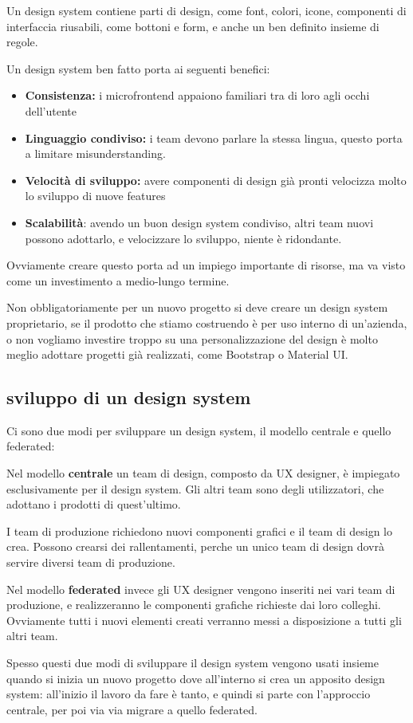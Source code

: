 Un design system contiene parti di design, come font, colori, icone, componenti di interfaccia riusabili, come bottoni 
e form, e anche un ben definito insieme di regole.

Un design system ben fatto porta ai seguenti benefici:
\begin{itemize}
    \item \textbf{Consistenza:} i microfrontend appaiono familiari tra di loro agli occhi dell’utente
    \item \textbf{Linguaggio condiviso:} i team devono parlare la stessa lingua, questo porta a limitare misunderstanding.
    \item \textbf{Velocità di sviluppo:} avere componenti di design già pronti velocizza molto lo sviluppo di nuove features
    \item \textbf{Scalabilità}: avendo un buon design system condiviso, altri team nuovi possono adottarlo, e velocizzare lo sviluppo, niente è ridondante.
\end{itemize}
Ovviamente creare questo porta ad un impiego importante di risorse, ma va visto come un investimento a medio-lungo termine.


Non obbligatoriamente per un nuovo progetto si deve creare un design system proprietario, se il prodotto che stiamo costruendo è 
per uso interno di un’azienda, o non vogliamo investire troppo su una personalizzazione del design è molto meglio adottare progetti
 già realizzati, come Bootstrap o Material UI.

\subsection{sviluppo di un design system}
Ci sono due modi per sviluppare un design system, il modello centrale e quello federated:

Nel modello \textbf{centrale} un team di design, composto da UX designer, è impiegato esclusivamente per il design system. Gli altri team sono degli utilizzatori, che adottano i
 prodotti di quest'ultimo.

I team di produzione richiedono nuovi componenti grafici e il team di design lo crea. 
Possono crearsi dei rallentamenti, perche un unico team di design dovrà servire diversi team di produzione.

Nel modello \textbf{federated} invece gli UX designer vengono inseriti nei vari team di produzione, e realizzeranno le componenti grafiche richieste dai loro colleghi. 
Ovviamente tutti i nuovi elementi creati verranno messi a disposizione a tutti gli altri team.


Spesso questi due modi di sviluppare il design system vengono usati insieme quando si inizia un nuovo progetto dove 
all'interno si crea un apposito design system: all’inizio il lavoro da fare
 è tanto, e quindi si parte con l’approccio centrale, per poi via via migrare a quello federated.